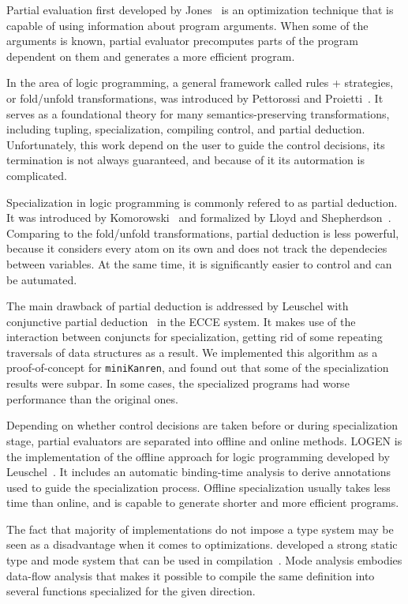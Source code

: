 Partial evaluation first developed by Jones~\cite{jones1993partial,intro2partialEvaluation} is an optimization technique that is capable of using information about program arguments.
When some of the arguments is known, partial evaluator precomputes parts of the program dependent on them and generates a more efficient program. 

In the area of logic programming, a general framework called rules + strategies, or fold/unfold transformations, was introduced by Pettorossi and Proietti~\cite{pettorossi1996rules,pettorossi1994transformation}. 
It serves as a foundational theory for many semantics-preserving transformations, including tupling, specialization, compiling control, and partial deduction. 
Unfortunately, this work depend on the user to guide the control decisions, its termination is not always guaranteed, and because of it its autormation is complicated. 

Specialization in logic programming is commonly refered to as partial deduction. 
It was introduced by Komorowski~\cite{komorowski1982partial} and formalized by Lloyd and Shepherdson~\cite{lloyd1991partial}. 
Comparing to the fold/unfold transformations, partial deduction is less powerful, because it considers every atom on its own and does not track the dependecies between variables. 
At the same time, it is significantly easier to control and can be autumated. 

The main drawback of partial deduction is addressed by Leuschel with conjunctive partial deduction~\cite{de1999conjunctive} in the ECCE system. 
It makes use of the interaction between conjuncts for specialization, getting rid of some repeating traversals of data structures as a result. 
We implemented this algorithm as a proof-of-concept for \texttt{miniKanren}, and found out that some of the specialization results were subpar.
In some cases, the specialized programs had worse performance than the original ones. 

Depending on whether control decisions are taken before or during specialization stage, partial evaluators are separated into offline and online methods. 
LOGEN is the implementation of the offline approach for logic programming developed by Leuschel~\cite{leuschel2004offline}. 
It includes an automatic binding-time analysis to derive annotations used to guide the specialization process. 
Offline specialization usually takes less time than online, and is capable to generate shorter and more efficient programs. 

The fact that majority of \prolog implementations do not impose a type system may be seen as a disadvantage when it comes to optimizations. 
\merc developed a strong static type and mode system that can be used in compilation~\cite{overton2002constraint,overton2003precise}. 
Mode analysis embodies data-flow analysis that makes it possible to compile the same definition into several functions specialized for the given direction. 
